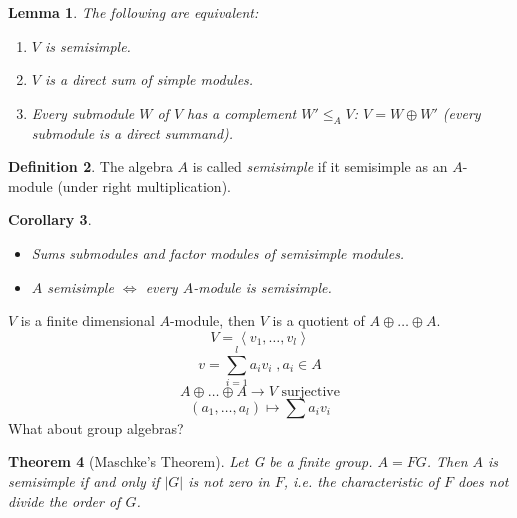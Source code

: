 \documentclass[12pt]{amsart}
\newtheorem{theorem}{Theorem}[section]
\newtheorem{lemma}[theorem]{Lemma}
\newtheorem{corollary}[theorem]{Corollary}
\theoremstyle{definition}
\newtheorem{definition}[theorem]{Definition}
\begin{document}
\begin{lemma}
The following are equivalent:
\begin{enumerate}
\item $V$ is semisimple.
\item $V$ is a direct sum of simple modules.
\item Every submodule $W$ of $V$ has a complement $W' \leq_{A} V$: $V = W \oplus W'$ (every submodule is a direct summand).
\end{enumerate}
\end{lemma}

\begin{definition}
The algebra $A$ is called \emph{semisimple} if it semisimple as an $A$-module (under right multiplication).
\end{definition}

\begin{corollary}
\begin{itemize}
\item Sums submodules and factor modules of semisimple modules.
\item $A$ semisimple $\Leftrightarrow$ every $A$-module is semisimple.
\end{itemize}
\end{corollary}

$V$ is a finite dimensional $A$-module, then $V$ is a quotient of $A \oplus \ldots \oplus A$.
$$V = \left\langle v_{1}, \ldots, v_{l} \right\rangle$$
$$v = \sum_{i= 1}^{l} {a_{i}}{v_{i}} \; , a_{i} \in A$$
$$A \oplus \ldots \oplus A \rightarrow V \text{ surjective}$$
$$\left( a_{1}, \ldots, a_{l} \right) \mapsto \sum{a_{i}}{v_{i}}$$
What about group algebras?

\begin{theorem}[Maschke's Theorem]
Let G be a finite group. $A = FG$. Then $A$ is semisimple if and only if $\left| G\right|$ is not zero in $F$, i.e. the characteristic of $F$ does not divide the order of $G$.
\end{theorem}
\end{document}
